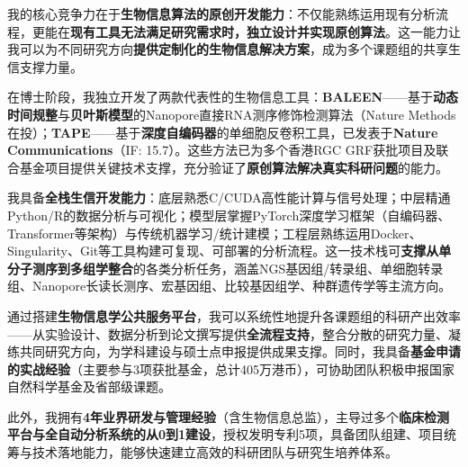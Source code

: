 

\begin{cvparagraph}

我的核心竞争力在于\textbf{\textcolor{awesome}{生物信息算法的原创开发能力}}：不仅能熟练运用现有分析流程，更能在\textbf{\textcolor{awesome}{现有工具无法满足研究需求时，独立设计并实现原创算法}}。这一能力让我可以为不同研究方向\textbf{\textcolor{awesome}{提供定制化的生物信息解决方案}}，成为多个课题组的共享生信支撑力量。

在博士阶段，我独立开发了两款代表性的生物信息工具：\textbf{\textcolor{awesome}{BALEEN}}——基于\textbf{动态时间规整}与\textbf{贝叶斯模型}的Nanopore直接RNA测序修饰检测算法（Nature Methods在投）；\textbf{\textcolor{awesome}{TAPE}}——基于\textbf{深度自编码器}的单细胞反卷积工具，已发表于\textbf{Nature Communications}（IF: 15.7）。这些方法已为多个香港RGC GRF获批项目及联合基金项目提供关键技术支撑，充分验证了\textbf{\textcolor{awesome}{原创算法解决真实科研问题}}的能力。

我具备\textbf{\textcolor{awesome}{全栈生信开发能力}}：底层熟悉C/CUDA高性能计算与信号处理；中层精通Python/R的数据分析与可视化；模型层掌握PyTorch深度学习框架（自编码器、Transformer等架构）与传统机器学习/统计建模；工程层熟练运用Docker、Singularity、Git等工具构建可复现、可部署的分析流程。这一技术栈可\textbf{\textcolor{awesome}{支撑从单分子测序到多组学整合}}的各类分析任务，涵盖NGS基因组/转录组、单细胞转录组、Nanopore长读长测序、宏基因组、比较基因组学、种群遗传学等主流方向。

通过搭建\textbf{\textcolor{awesome}{生物信息学公共服务平台}}，我可以系统性地提升各课题组的科研产出效率——从实验设计、数据分析到论文撰写提供\textbf{全流程支持}，整合分散的研究力量、凝练共同研究方向，为学科建设与硕士点申报提供成果支撑。同时，我具备\textbf{\textcolor{awesome}{基金申请的实战经验}}（主要参与3项获批基金，总计405万港币），可协助团队积极申报国家自然科学基金及省部级课题。

此外，我拥有\textbf{4年业界研发与管理经验}（含生物信息总监），主导过多个\textbf{\textcolor{awesome}{临床检测平台与全自动分析系统的从0到1建设}}，授权发明专利5项，具备团队组建、项目统筹与技术落地能力，能够快速建立高效的科研团队与研究生培养体系。

\end{cvparagraph}
